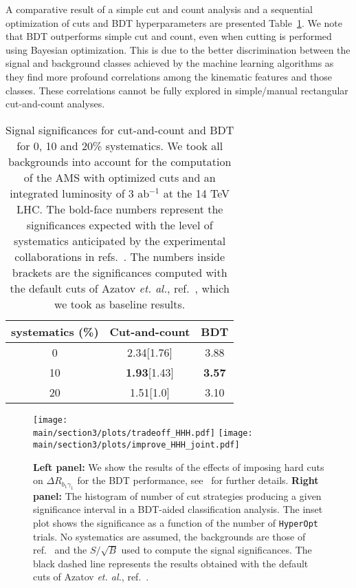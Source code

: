 A comparative result of a simple cut and count analysis and a sequential optimization of cuts and BDT hyperparameters are presented  Table~\ref{table:resultsbdtKS}. We note that BDT outperforms simple cut and count, even when cutting is performed using Bayesian optimization. This is due to the better discrimination between the signal and background classes achieved by the machine learning algorithms as they find more profound correlations among the kinematic features and those classes. These correlations cannot be fully explored in simple/manual rectangular cut-and-count analyses. 

%
\begin{table}[h]
\centering
\begin{tabular}{c|c|c}
\hline
systematics (\%) & Cut-and-count & BDT \\
\hline\hline 
0 & 2.34[1.76] & 3.88 \\
\hline
10 & {\bf 1.93}[1.43] & {\bf 3.57}  \\
\hline
20 & 1.51[1.0] & 3.10  \\
\hline\hline
\end{tabular}
\caption{Signal significances for cut-and-count and BDT for 0, 10 and 20\% systematics. We took all backgrounds into account for the computation of the AMS with optimized cuts and an integrated luminosity of 3 ab$^{-1}$ at the 14 TeV LHC. The bold-face numbers represent the significances expected with the level of systematics anticipated by the experimental collaborations in refs.~\cite{ATL-PHYS-PUB-2017-001, CMS}. The numbers inside brackets are the significances computed with the default cuts of Azatov \emph{et. al.}, ref.~\cite{Azatov:2015oxa}, which we took as baseline results.}
\label{table:resultsbdtKS}
\end{table}
%
%
\begin{figure}[!t]
\centering
\texttt{[image: \\main/section3/plots/tradeoff\_HHH.pdf]}
\texttt{[image: \\main/section3/plots/improve\_HHH\_joint.pdf]}
\caption{\textbf{Left panel:}  We show the results of the effects of imposing hard cuts on $\Delta R_{b_1\gamma_1}$ for the BDT performance, see~\cite{Alves:2017ued} for further details. \textbf{Right panel:} The histogram of number of cut strategies producing a given significance interval in a BDT-aided classification analysis. The inset plot shows the significance as a function of the number of \texttt{HyperOpt} trials. No systematics are assumed, the backgrounds are those of ref.~\cite{Azatov:2015oxa} and the $S/\sqrt{B}$ used to compute the signal significances. The black dashed line represents the results obtained with the default cuts of Azatov \emph{et. al.}, ref.~\cite{Azatov:2015oxa}.}
\label{fig:8resultsKS}
\end{figure}
